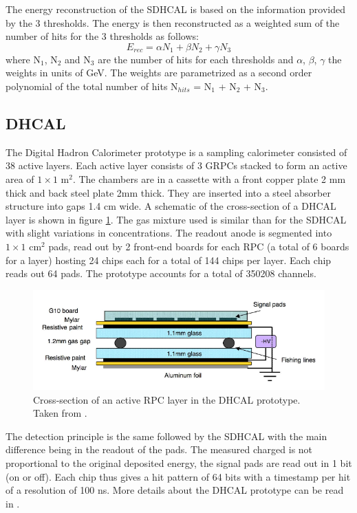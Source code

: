 The energy reconstruction of the SDHCAL is based on the information provided by the 3 thresholds. The energy is then reconstructed as a weighted sum of the number of hits for the 3 thresholds as follows:
\begin{equation}
  E_{rec} = \alpha N_1 + \beta N_2 + \gamma N_3
\end{equation}
where N$_1$, N$_2$ and N$_3$ are the number of hits for each thresholds and $\alpha$, $\beta$, $\gamma$ the weights in units of GeV. The weights are parametrized as a second order polynomial of the total number of hits N$_{hits}$ =  N$_1$ + N$_2$ + N$_3$.

\subsection{DHCAL}

The Digital Hadron Calorimeter prototype is a sampling calorimeter consisted of 38 active layers. Each active layer consists of 3 GRPCs stacked to form an active area of $1\times1$ m$^2$. The chambers are in a cassette with a front copper plate 2 mm thick and back steel plate 2mm thick. They are inserted into a steel absorber structure into gaps 1.4 cm wide. A schematic of the cross-section of a DHCAL layer is shown in figure \ref{fig:DHCALCross}. The gas mixture used is similar than for the SDHCAL with slight variations in concentrations. The readout anode is segmented into $1\times1$ cm$^2$ pads, read out by 2 front-end boards for each RPC (a total of 6 boards for a layer) hosting 24 chips each for a total of 144 chips per layer. Each chip reads out 64 pads. The prototype accounts for a total of 350208 channels.

\begin{figure}[htbp!]
  \centering
  \includegraphics[width=0.9\linewidth]{chap3/fig/Cross-section-DHCAL.png}
  \caption{Cross-section of an active RPC layer in the DHCAL prototype. Taken from \cite{1748-0221-3-05-P05001}.} \label{fig:DHCALCross}
\end{figure}

The detection principle is the same followed by the SDHCAL with the main difference being in the readout of the pads. The measured charged is not proportional to the original deposited energy, the signal pads are read out in 1 bit (on or off). Each chip thus gives a hit pattern of 64 bits with a timestamp per hit of a resolution of 100 ns. More details about the DHCAL prototype can be read in \cite{Neubueser2016}.

